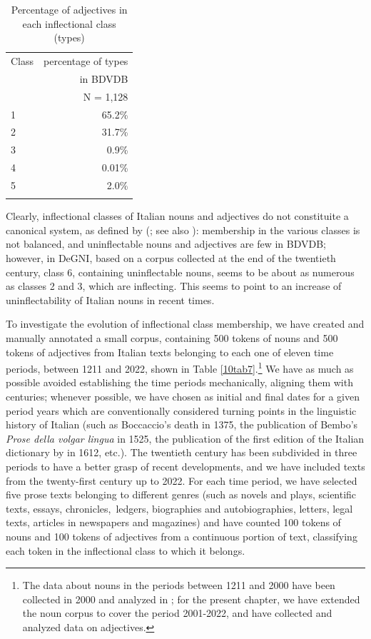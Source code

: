 \documentclass[output=paper,colorlinks,citecolor=brown]{langscibook}
\begin{document}
\begin{table}[ht]
	\centering
	\begin{tabularx}{0.4\textwidth}{lr}
		\lsptoprule
			Class & percentage of types \\
			& in BDVDB \\
			& N = 1,128 \\
			\midrule
			1 & 65.2\% \\
			2 & 31.7\% \\
			3 & 0.9\% \\
			4 & 0.01\% \\
			\rowcolor{gray!25}
			5 & 2.0\% \\
		\lspbottomrule
	\end{tabularx}
	\caption{Percentage of adjectives in each inflectional class (types)}
	\label{10tab6}
\end{table}

Clearly, inflectional classes of Italian nouns and adjectives do not constituite a canonical system, as defined by \citeauthor{corbett2009} (\citeyear{corbett2009}; see also \citealt[79--87]{thornton2019-noncanonical}): membership in the various classes is not balanced, and uninflectable nouns and adjectives are few in BDVDB; however, in DeGNI, based on a corpus collected at the end of the twentieth century, class 6, containing uninflectable nouns, seems to be about as numerous as classes 2 and 3, which are inflecting. This seems to point to an increase of uninflectability of Italian nouns in recent times.

\largerpage[0.5]
To investigate the evolution of inflectional class membership, we have created and manually annotated a small corpus, containing 500 tokens of nouns and 500 tokens of adjectives from Italian texts belonging to each one of eleven time periods, between 1211 and 2022, shown in Table \ref{10tab7}.\footnote{The data about nouns in the periods between 1211 and 2000 have been collected in 2000 and analyzed in \citet{dachillethornton2003}; for the present chapter, we have extended the noun corpus to cover the period 2001-2022, and have collected and analyzed data on adjectives.} We have as much as possible avoided establishing the time periods mechanically, aligning them with centuries; whenever possible, we have chosen as initial and final dates for a given period years which are conventionally considered turning points in the linguistic history of Italian (such as Boccaccio's death in 1375, the publication of Bembo's \emph{Prose della volgar lingua} in 1525, the publication of the first edition of the Italian dictionary by  in 1612, etc.). The twentieth century has been subdivided in three periods to have a better grasp of recent developments, and we have included texts from the twenty-first century up to 2022. For each time period, we have selected five prose texts belonging to different genres (such as novels and plays, scientific texts, essays, chronicles,~ledgers, biographies and autobiographies, letters, legal texts, articles in newspapers and magazines) and have counted 100 tokens of nouns and 100 tokens of adjectives from a continuous portion of text, classifying each token in the inflectional class to which it belongs.
\end{document}
